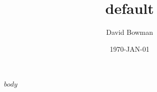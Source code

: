 \documentclass[a4paper,$if(weaDocStyle)$10pt$else$11pt$endif$]{article}
\title{\weaTitle}
\title{default}
\author{\weaAuthor}
\author{David Bowman}
\date{\weaDate}
\date{1970-JAN-01}
\makeatletter
\def\weaAuthor{\detokenize{$author$}}
\def\weaAuthor{}
\def\weaEmail{\detokenize{$weaEmail$}}
\def\weaEmail{admin@whateverany.com}
\def\weaTitlepage{true}
\def\weaTitlepage{false}
\renewcommand{\maketitle}{
    \begin{center}
      {\weaFontAuthor\Huge\textbf{\weaAuthor}} \\[1.5ex]
      \noindent
      \ifdefempty{\weaPhone}{}{{\weaFontContact\scriptsize\hspace{0.1em} \faPhone\hspace{0.1em} \weaPhone}}
      \ifdefempty{\weaEmail}{}{{\weaFontContact\scriptsize\hspace{0.1em} \faEnvelope\hspace{0.1em} \weaEmail}}
      \ifdefempty{\weaLinkedIn}{}{{\weaFontContact\scriptsize\hspace{0.1em} \faLinkedinIn\hspace{0.1em} \weaLinkedIn}}
      \ifdefempty{\weaURL}{}{{\weaFontContact\scriptsize\hspace{0.1em} \faGlobe\hspace{0.1em} \weaURL}}
    \end{center}
    \vspace{1.5ex}
  }
\renewcommand{\maketitle}{
      \begin{flushright}
        {\weaFontAuthor\Large \weaAuthor} \\[-0.5em]
        {\weaFontContact\tiny \weaEmail} \\[-0.5em]
      \end{flushright}
    }
\renewcommand{\maketitle}{
      \begin{flushright}
        {\weaFontAuthor\Large \weaAuthor} \\[-0.5em]
        {\weaFontContact\tiny \weaEmail} \\[-0.5em]
      \end{flushright}
    }
\renewcommand{\maketitle}{%
    \begin{center}
      {\weaFontAuthor\Huge\textbf{\weaAuthor}} \\[1.5ex]
      \noindent
      \ifdefempty{\weaPhone}{}{{\weaFontContact\scriptsize\hspace{0.1em} \faPhone\hspace{0.1em} \weaPhone}}
      \ifdefempty{\weaEmail}{}{{\weaFontContact\scriptsize\hspace{0.1em} \faEnvelope\hspace{0.1em} \weaEmail}}
      \ifdefempty{\weaLinkedIn}{}{{\weaFontContact\scriptsize\hspace{0.1em} \faLinkedinIn\hspace{0.1em} \weaLinkedIn}}
      \ifdefempty{\weaURL}{}{{\weaFontContact\scriptsize\hspace{0.1em} \faGlobe\hspace{0.1em} \weaURL}}
    \end{center}
    \vspace{1.5ex}
  }
\makeatother
\begin{document}
\ifstrequal{\weaTitlepage}{true}{%
  \maketitle
}{}

$body$
\end{document}
